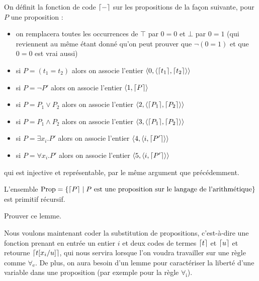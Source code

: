 \begin{defi}
    On définit la fonction de code $\lceil - \rceil$ sur les propositions de la façon suivante, pour $P$ une proposition :
    \begin{itemize}[label=$\bullet$]
        \item on remplacera toutes les occurrences de $\top$ par $0=0$ et $\bot$ par $0=1$ (qui reviennent au même étant donné qu'on peut prouver que $\lnot (0=1)$ et que $0=0$ est vrai aussi)
        \item si $P = (t_1=t_2)$ alors on associe l'entier $\langle 0,\langle\lceil t_1 \rceil,\lceil t_2 \rceil\rangle\rangle$
        \item si $P = \lnot P'$ alors on associe l'entier $\langle 1,\lceil P \rceil\rangle$
        \item si $P = P_1 \lor P_2$ alors on associe l'entier $\langle 2,\langle \lceil P_1 \rceil,\lceil P_2 \rceil\rangle\rangle$
        \item si $P = P_1 \land P_2$ alors on associe l'entier $\langle 3,\langle \lceil P_1 \rceil,\lceil P_2 \rceil\rangle\rangle$
        \item si $P = \exists x_i. P'$ alors on associe l'entier $\langle 4,\langle i,\lceil P' \rceil\rangle\rangle$
        \item si $P = \forall x_i. P'$ alors on associe l'entier $\langle 5,\langle i,\lceil P' \rceil\rangle\rangle$
    \end{itemize}
    qui est injective et représentable, par le même argument que précédemment.
\end{defi}

\begin{lem}
    L'ensemble $\mathrm{Prop} = \{\lceil P \rceil\mid P \text{ est une proposition sur le langage de l'arithmétique}\}$ est primitif récursif.
\end{lem}

\begin{exo}
    Prouver ce lemme.
\end{exo}

Nous voulons maintenant coder la substitution de propositions, c'est-à-dire une fonction prenant en entrée un entier $i$ et deux codes de termes $\lceil t \rceil$ et $\lceil u \rceil$ et retourne $\lceil t[x_i/u] \rceil$, qui nous servira lorsque l'on voudra travailler sur une règle comme $\forall_\mathrm e$. De plus, on aura besoin d'un lemme pour caractériser la liberté d'une variable dans une proposition (par exemple pour la règle $\forall_\mathrm i$).

